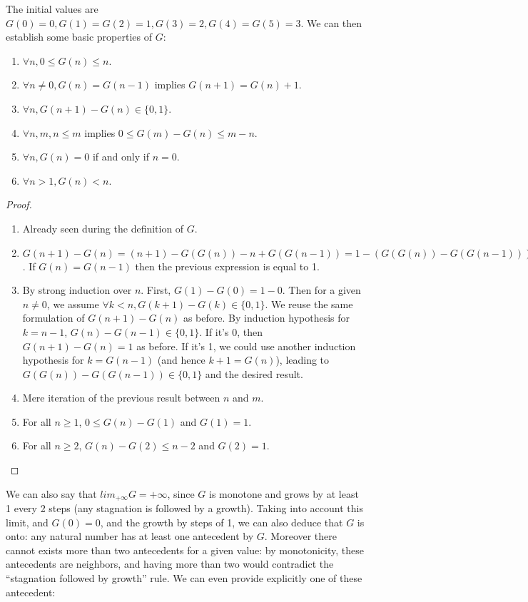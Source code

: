 \documentclass[a4paper,11pt]{article}
\begin{document}
The initial values are $G(0)=0, G(1)=G(2)=1, G(3)=2, G(4)=G(5)=3$.
We can then establish some basic properties of $G$:
\begin{theorem}\label{Gprops}
\noindent
\begin{enumerate}
\item $\forall n, 0 \le G(n) \le n$.
\item $\forall n\neq 0, G(n)=G(n-1)$ implies $G(n+1)=G(n)+1$.
\item $\forall n, G(n+1)-G(n) \in \{0,1\}$.
\item $\forall n,m, n\le m$ implies $0 \le G(m)-G(n) \le m-n$.
\item $\forall n, G(n)=0$ if and only if $n=0$.
\item $\forall n>1, G(n)<n$.
\end{enumerate}
\end{theorem}
\begin{proof}
\noindent
\begin{enumerate}
\item Already seen during the definition of $G$.
\item $G(n+1)-G(n) = (n+1)-G(G(n))-n+G(G(n-1)) = 1 - (G(G(n))-G(G(n-1)))$.
If $G(n)=G(n-1)$ then the previous expression is equal to 1.
\item By strong induction over $n$. First, $G(1)-G(0)=1-0$. Then
for a given $n\neq 0$, we assume $\forall k<n, G(k+1)-G(k) \in \{0,1\}$.
We reuse the same formulation of $G(n+1)-G(n)$ as before.
By induction hypothesis for $k=n-1$, $G(n)-G(n-1) \in\{0,1\}$.
If it's 0, then $G(n+1)-G(n) = 1$ as before. If it's 1, we could use another
induction hypothesis for $k=G(n-1)$ (and hence $k+1 = G(n)$), leading
to $G(G(n))-G(G(n-1)) \in \{0,1\}$ and the desired result.
\item Mere iteration of the previous result between $n$ and $m$.
\item For all $n\ge 1$, $0 \le G(n)-G(1)$ and $G(1)=1$.
\item For all $n\ge 2$, $G(n)-G(2) \le n-2$ and $G(2)=1$.
\end{enumerate}
\end{proof}

We can also say that $lim_{+\infty} G = +\infty$, since $G$ is
monotone and grows by at least 1 every 2 steps (any stagnation
is followed by a growth). Taking into account this limit, and
$G(0)=0$, and the growth by steps of 1, we can also deduce
that $G$ is onto: any natural number has at least one antecedent
by $G$. Moreover there cannot exists more than two antecedents
for a given value: by monotonicity, these antecedents are neighbors,
and having more than two would contradict the ``stagnation followed
by growth'' rule.
We can even provide explicitly one of these antecedent:
\end{document}
